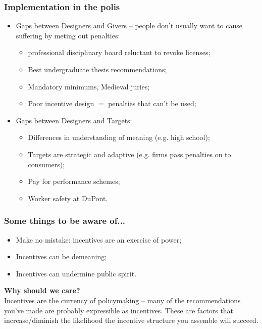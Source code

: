 \documentclass[aspectratio=169]{beamer}
\theoremstyle{principle}
\begin{document}
\begin{frame}
\frametitle{Implementation in the polis}

\begin{itemize}
\item Gaps between Designers and Givers --  people don't usually want to cause suffering by meting out penalties:
\begin{itemize}
\item professional disciplinary board reluctant to revoke licenses;
\item Best undergraduate thesis recommendations;
\item Mandatory minimums, Medieval juries;
\item Poor incentive design $=$ penalties that can't be used;
\end{itemize}
\bigskip
\bigskip
\item Gaps between Designers and Targets:
\begin{itemize}
\item Differences in understanding of meaning (e.g. high school);
\item Targets are strategic and adaptive (e.g. firms pass penalties on to consumers);
\item Pay for performance schemes;
\item Worker safety at DuPont.
\end{itemize}
\end{itemize}

\end{frame}

\begin{frame}
\frametitle{Some things to be aware of...}

\begin{itemize}
\item Make no mistake: incentives are an exercise of power;
\bigskip
\bigskip
\bigskip
\item Incentives can be demeaning;
\bigskip
\bigskip
\bigskip
\item Incentives can undermine public spirit.
\end{itemize}

\end{frame}

\begin{frame}

\begin{center}
\Huge\textbf{Why should we care?}\\
\bigskip
\bigskip
\large Incentives are the currency of policymaking -- many of the recommendations you've made are probably expressible as incentives.  These are factors that increase/diminish the likelihood the incentive structure you assemble will succeed.
\\
\end{center}

\end{frame}
\end{document}
